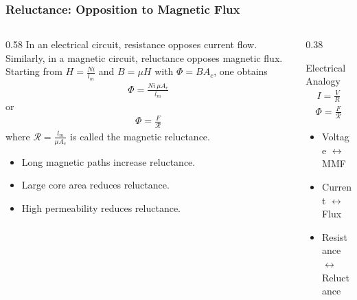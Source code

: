 \begin{frame} 
    \frametitle{Reluctance: Opposition to Magnetic Flux} 
    \begin{columns} 
        \begin{column}{0.58\textwidth} 
            In an electrical circuit, resistance opposes current flow. Similarly, in a magnetic circuit, reluctance opposes magnetic flux. 
            Starting from 
                $H=\frac{Ni}{l_m}$ and $B=\mu H$ 
            with $\Phi=BA_c$, one obtains 
            \begin{align} 
                \Phi = \frac{Ni\,\mu A_c}{l_m} 
            \end{align} or 
            \begin{align} 
                \Phi = \frac{F}{\mathcal R} 
            \end{align} 
            where $\mathcal R = \frac{l_m}{\mu A_c}$ is called the magnetic reluctance.
            \begin{itemize}
                \item Long magnetic paths increase reluctance. 
                \item Large core area reduces reluctance. 
                \item High permeability reduces reluctance. 
            \end{itemize} 
        \end{column} 
        \begin{column}{0.38\textwidth} 
            \begin{block}{Electrical Analogy} 
                \begin{align} 
                    I=\frac{V}{R} 
                \end{align} 
                \begin{align} 
                    \Phi=\frac{F}{\mathcal R} 
                \end{align} 
            \end{block} 
            \begin{itemize} 
                \item Voltage $\leftrightarrow$ MMF 
                \item Current $\leftrightarrow$ Flux 
                \item Resistance $\leftrightarrow$ Reluctance 
            \end{itemize} 
        \end{column} 
    \end{columns} 
\end{frame}


